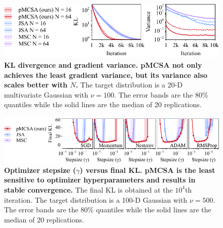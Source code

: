 

\begin{figure}
  \vspace{-0.2in}
  \centering
  \includegraphics[scale=1.0]{figures/gaussian_02.pdf}
  \vspace{-0.07in}
  \caption{\textbf{
      KL divergence and gradient variance.
      pMCSA not only achieves the least gradient variance, but its variance also scales better with \(N\).
    }
    The target distribution is a 20-D multivariate Gaussian with \(\nu = 100\).
    The error bands are the 80\% quantiles while the solid lines are the median of 20 replications.
  }\label{fig:gaussian}
\end{figure}
\begin{figure}
  \vspace{-0.13in}
  \centering
  \includegraphics[scale=1.0]{figures/stepsize_02.pdf}
  \vspace{-0.13in}
  \caption{\textbf{Optimizer stepsize (\(\gamma\)) versus final KL.
      pMCSA is the least sensitive to optimizer hyperparameters and results in stable convergence.}
      The final KL is obtained at the \(10^4\)th iteration.
      The target distribution is a 100-D Gaussian with \(\nu = 500\).
      The error bands are the 80\% quantiles while the solid lines are the median of 20 replications.
  }\label{fig:stepsize}
  \vspace{-0.15in}
\end{figure}

